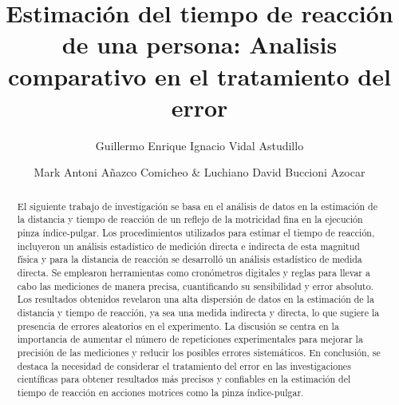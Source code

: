 \documentclass[runningheads]{llncs}
\begin{document}
    \title{
        Estimación del tiempo de reacción de una persona: Analisis comparativo en el tratamiento del error
    }
    \author{
        Guillermo Enrique Ignacio Vidal Astudillo 
        \and Mark Antoni Añazco Comicheo 
        \& Luchiano David Buccioni Azocar
    }
    
    \maketitle
    
    \begin{abstract}
        El siguiente trabajo de investigación se basa en el análisis de datos en la estimación de la distancia y tiempo de reacción de un reflejo de la motricidad fina en la ejecución pinza índice-pulgar. Los procedimientos utilizados para estimar el tiempo de reacción, 
        incluyeron un análisis estadístico de medición directa e indirecta de esta magnitud física y para la distancia de reacción se desarrolló un análisis estadístico de medida directa. Se emplearon herramientas como cronómetros digitales y reglas para llevar a cabo las mediciones de manera precisa, 
        cuantificando su sensibilidad y error absoluto. Los resultados obtenidos revelaron una alta dispersión de datos en la estimación de la distancia y tiempo de reacción, ya sea una medida indirecta y directa, lo que sugiere la presencia de errores aleatorios en el experimento. 
        La discusión se centra en la importancia de aumentar el número de repeticiones experimentales para mejorar la precisión de las mediciones y reducir los posibles errores sistemáticos. En conclusión, se destaca la necesidad de considerar el tratamiento del error en las investigaciones científicas 
        para obtener resultados más precisos y confiables en la estimación del tiempo de reacción en acciones motrices como la pinza índice-pulgar.
    \end{abstract}
\end{document}
